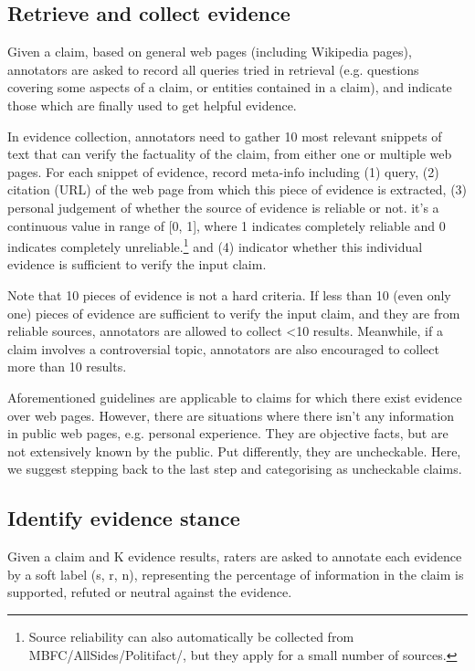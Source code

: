 \documentclass[11pt]{article}
\begin{document}
\subsection{Retrieve and collect evidence}
Given a claim, based on general web pages (including Wikipedia pages), annotators are asked to record all queries tried in retrieval (e.g. questions covering some aspects of a claim, or entities contained in a claim), and indicate those which are finally used to get helpful evidence.

In evidence collection, annotators need to gather 10 most relevant snippets of text that can verify the factuality of the claim, from either one or multiple web pages.
For each snippet of evidence, record meta-info including (1) query, (2) citation (URL) of the web page from which this piece of evidence is extracted, (3) personal judgement of whether the source of evidence is reliable or not. it's a continuous value in range of [0, 1], where 1 indicates completely reliable and 0 indicates completely unreliable.\footnote{Source reliability can also automatically be collected from MBFC/AllSides/Politifact/, but they apply for a small number of sources.} and (4) indicator whether this individual evidence is sufficient to verify the input claim. 

Note that 10 pieces of evidence is not a hard criteria.
If less than 10 (even only one) pieces of evidence are sufficient to verify the input claim, and they are from reliable sources, annotators are allowed to collect <10 results.
Meanwhile, if a claim involves a controversial topic, annotators are also encouraged to collect more than 10 results.

Aforementioned guidelines are applicable to claims for which there exist evidence over web pages.
However, there are situations where there isn't any information in public web pages, e.g. personal experience.
They are objective facts, but are not extensively known by the public.
Put differently, they are uncheckable.
Here, we suggest stepping back to the last step and categorising as uncheckable claims. 


\subsection{Identify evidence stance}
Given a claim and K evidence results, raters are asked to annotate each evidence by a soft label (s, r, n), representing the percentage of information in the claim is supported, refuted or neutral against the evidence.
\end{document}
